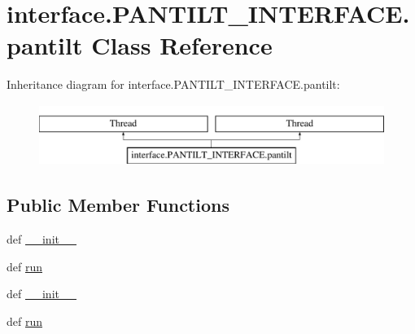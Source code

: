 \hypertarget{classinterface_1_1PANTILT__INTERFACE_1_1pantilt}{}\section{interface.\+P\+A\+N\+T\+I\+L\+T\+\_\+\+I\+N\+T\+E\+R\+F\+A\+C\+E.\+pantilt Class Reference}
\label{classinterface_1_1PANTILT__INTERFACE_1_1pantilt}
Inheritance diagram for interface.\+P\+A\+N\+T\+I\+L\+T\+\_\+\+I\+N\+T\+E\+R\+F\+A\+C\+E.\+pantilt\+:\begin{figure}[H]
\begin{center}
\leavevmode
\includegraphics[height=2.000000cm]{classinterface_1_1PANTILT__INTERFACE_1_1pantilt}
\end{center}
\end{figure}
\subsection*{Public Member Functions}
\begin{DoxyCompactItemize}
\item 
def \hyperlink{classinterface_1_1PANTILT__INTERFACE_1_1pantilt_aa7d020e58aa179449247b1f13633fad5}{\+\_\+\+\_\+init\+\_\+\+\_\+}
\item 
def \hyperlink{classinterface_1_1PANTILT__INTERFACE_1_1pantilt_a392fb49d4df58462baeece46745f43f7}{run}
\item 
def \hyperlink{classinterface_1_1PANTILT__INTERFACE_1_1pantilt_aa7d020e58aa179449247b1f13633fad5}{\+\_\+\+\_\+init\+\_\+\+\_\+}
\item 
def \hyperlink{classinterface_1_1PANTILT__INTERFACE_1_1pantilt_a392fb49d4df58462baeece46745f43f7}{run}
\end{DoxyCompactItemize}
